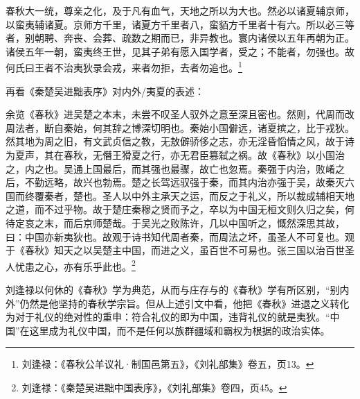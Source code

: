 \documentclass[a4paper, 12pt, openright]{ctexbook}
\renewenvironment{quote}
  {\list{}{\rightmargin2\ccwd \leftmargin2\ccwd \itemindent=2\ccwd \listparindent=2\ccwd}%
   \item\relax\small\kaishu\color{black}}
  {\endlist}
\begin{document}
\begin{quote}
春秋大一统，尊亲之化，及于凡有血气，天地之所以为大也。然必以诸夏辅京师，以蛮夷辅诸夏。京师方千里，诸夏方千里者八，蛮貊方千里者十有六。所以必三等者，别朝聘、奔丧、会葬、疏数之期而已，非异教也。寰内诸侯以五年再朝为正。诸侯五年一朝，蛮夷终王世，见其子弟有愿入国学者，受之；不能者，勿强也。故何氏曰王者不治夷狄录会戎，来者勿拒，去者勿追也。\footnote{刘逢禄：《春秋公羊议礼·制国邑第五》，《刘礼部集》卷五，页13。}
\end{quote}

再看《秦楚吴进黜表序》对内外/夷夏的表述：

\begin{quote}
余览《春秋》进吴楚之本末，未尝不叹圣人驭外之意至深且密也。然则，代周而改周法者，断自秦始，何其辞之博深切明也。秦始小国僻远，诸夏摈之，比于戎狄。然其地为周之旧，有文武贞信之教，无敖僻骄侈之志，亦无淫昏慆情之风，故于诗为夏声，其在春秋，无僭王猾夏之行，亦无君臣篡弑之祸。故《春秋》以小国治之，内之也。吴通上国最后，而其强也最骤，故亡也忽焉。秦强于内治，败崤之后，不勤远略，故兴也勃焉。楚之长驾远驭强于秦，而其内治亦强于吴，故秦灭六国而终覆秦者，楚也。圣人以中外主承天之运，而反之于礼义，所以裁成辅相天地之道，而不过乎物。故于楚庄秦穆之贤而予之，卒以为中国无桓文则久归之矣，何待定哀之末，而后京师楚哉。于吴光之败陈许，几以中国听之，慨然深思其故，曰：中国亦新夷狄也。故观于诗书知代周者秦，而周法之坏，虽圣人不可复也。观于《春秋》知天之以吴楚主中国，而进之义，虽百世不可易也。张三国以治百世圣人忧患之心，亦有乐乎此也。\footnote{刘逢禄：《秦楚吴进黜中国表序》，《刘礼部集》卷四，页45。}
\end{quote}

刘逢禄以何休的《春秋》学为典范，从而与庄存与的《春秋》学有所区别，“别内外”仍然是他坚持的春秋学宗旨。但从上述引文中看，他把《春秋》进退之义转化为对于礼仪的绝对性的重申：符合礼仪的即为中国，违背礼仪的就是夷狄。“中国”在这里成为礼仪中国，而不是任何以族群疆域和霸权为根据的政治实体。
\end{document}
